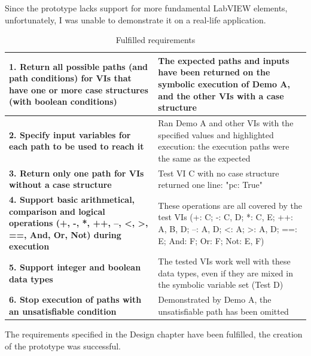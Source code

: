 Since the prototype lacks support for more fundamental LabVIEW elements, unfortunately, I was unable to demonstrate it on a real-life application.

\begin{table}[ht]
\centering
\begin{tabularx}{\linewidth}{XX}
\toprule
\textbf{1. Return all possible paths (and path conditions) for VIs that have one or more case structures (with boolean conditions)}                         & The expected paths and inputs have been returned on the symbolic execution of Demo A, and the other VIs with a case structure                                           \\ \midrule
\textbf{2. Specify input variables for each path to be used to reach it}                                                                                    & Ran Demo A and other VIs with the specified values and highlighted execution: the execution paths were the same as the expected                                         \\ \midrule
\textbf{3. Return only one path for VIs without a case structure}                                                                                           & Test VI C with no case structure returned one line: "pc: True"                                                                                           \\ \midrule
\textbf{4. Support basic arithmetical, comparison and logical operations (+, -, *, ++, --, \textless{}, \textgreater{}, ==, And, Or, Not) during execution} & These operations are all covered by the test VIs (+: C; -: C, D; *: C, E; ++: A, B, D; --: A, D; \textless{}: A; \textgreater{}: A, D; ==: E; And: F; Or: F; Not: E, F) \\ \midrule
\textbf{5. Support integer and boolean data types}                                                                                                          & The tested VIs work well with these data types, even if they are mixed in the symbolic variable set (Test D)                                                            \\ \midrule
\textbf{6. Stop execution of paths with an unsatisfiable condition}                                                                                         & Demonstrated by Demo A, the unsatisfiable path has been omitted                                                                                                         \\ \bottomrule
\end{tabularx}

\caption{Fulfilled requirements}
  \label{Tab:Requ}
\end{table}

The requirements specified in the Design chapter have been fulfilled, the creation of the prototype was successful.
